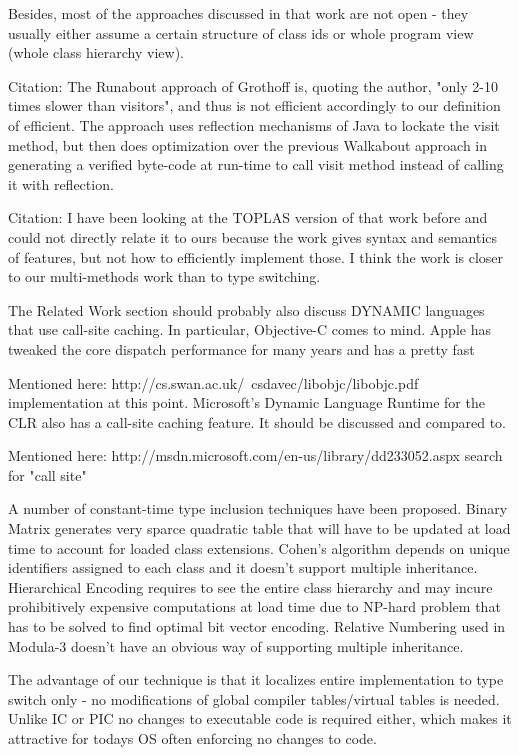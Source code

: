 Besides, most of the approaches discussed in that work are not open - they 
usually either assume a certain structure of class ids or whole program view 
(whole class hierarchy view).

Citation\cite{runabout}:
The Runabout approach of Grothoff is, quoting the author, "only 2-10 times 
slower than visitors", and thus is not efficient accordingly to our definition 
of efficient. The approach uses reflection mechanisms of Java to lockate the 
visit method, but then does optimization over the previous Walkabout approach in 
generating a verified byte-code at run-time to call visit method instead of 
calling it with reflection.

Citation\cite{Millstein:2002:MTH:581478.581489}:
I have been looking at the TOPLAS version of that work before and could not 
directly relate it to ours because the work gives syntax and semantics of 
features, but not how to efficiently implement those. I think the work is closer 
to our multi-methods work than to type switching.

The Related Work section should probably also discuss DYNAMIC languages that
use call-site caching. In particular, Objective-C comes to mind. Apple has
tweaked the core dispatch performance for many years and has a pretty fast

Mentioned here: http://cs.swan.ac.uk/~csdavec/libobjc/libobjc.pdf 
implementation at this point. Microsoft's Dynamic Language Runtime for the CLR
also has a call-site caching feature. It should be discussed and compared to.

Mentioned here:  http://msdn.microsoft.com/en-us/library/dd233052.aspx search for "call site"

A number of constant-time type inclusion techniques have been proposed. 
Binary Matrix generates very sparce quadratic table that will have to be updated 
at load time to account for loaded class extensions. Cohen's algorithm depends 
on unique identifiers assigned to each class and it doesn't support multiple 
inheritance. 
Hierarchical Encoding requires to see the entire class hierarchy and may incure 
prohibitively expensive computations at load time due to NP-hard problem that 
has to be solved to find optimal bit vector encoding. 
Relative Numbering used in Modula-3 doesn't have an obvious way of supporting 
multiple inheritance.

The advantage of our technique is that it localizes entire implementation to 
type switch only - no modifications of global compiler tables/virtual tables is 
needed. Unlike IC or PIC no changes to executable code is required either, which 
makes it attractive for todays OS often enforcing no changes to code.
